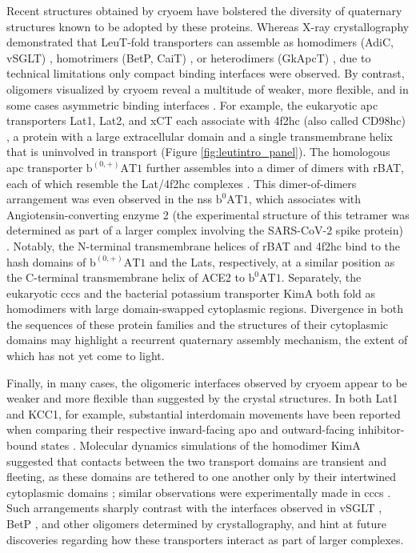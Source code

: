 Recent structures obtained by \gls{cryoem} have bolstered the diversity of quaternary structures known to be adopted by these proteins. Whereas X-ray crystallography demonstrated that LeuT-fold transporters can assemble as homodimers (AdiC, vSGLT) \citep*{Faham2008, Gao2009}, homotrimers (BetP, CaiT) \citep*{Ressl2009, Schulze2010}, or heterodimers (GkApcT) \citep*{Jungnickel2018}, due to technical limitations only compact binding interfaces were observed. By contrast, oligomers visualized by \gls{cryoem} reveal a multitude of weaker, more flexible, and in some cases asymmetric binding interfaces \citep*{Chew2019, Lee2019, Oda2020, Tascon2020, Yan2020a, Yan2020b, Yan2019, Yan2020}. For example, the eukaryotic \gls{apc} transporters Lat1, Lat2, and xCT each associate with 4f2hc (also called CD98hc) \citep*{Jeckelmann2020, Oda2020, Yan2019, Yan2020}, a protein with a large extracellular domain and a single transmembrane helix that is uninvolved in transport (Figure \ref{fig:leutintro_panel}). The homologous \gls{apc} transporter $\mathrm{b^{(0,+)}AT1}$ further assembles into a dimer of dimers with rBAT, each of which resemble the Lat/4f2hc complexes \citep*{Wu2020, Yan2020a}. This dimer-of-dimers arrangement was even observed in the \gls{nss} $\mathrm{b^{0}AT1}$, which associates with Angiotensin-converting enzyme 2 (the experimental structure of this tetramer was determined as part of a larger complex involving the SARS-CoV-2 spike protein) \citep*{Yan2020b}. Notably, the N-terminal transmembrane helices of rBAT and 4f2hc bind to the hash domains of $\mathrm{b^{(0,+)}AT1}$ and the Lats, respectively, at a similar position as the C-terminal transmembrane helix of ACE2 to $\mathrm{b^{0}AT1}$. Separately, the eukaryotic \gls{ccc}s \citep*{ Chew2019, Chi2020, Liu2019, Reid2020, Yang2020} and the bacterial potassium transporter KimA \citep*{Tascon2020} both fold as homodimers with large domain-swapped cytoplasmic regions. Divergence in both the sequences of these protein families and the structures of their cytoplasmic domains may highlight a recurrent quaternary assembly mechanism, the extent of which has not yet come to light.

Finally, in many cases, the oligomeric interfaces observed by \gls{cryoem} appear to be weaker and more flexible than suggested by the crystal structures. In both Lat1 and KCC1, for example, substantial interdomain movements have been reported when comparing their respective inward-facing apo and outward-facing inhibitor-bound states \citep*{Liu2019, Yan2021, Yan2019, Yan2020, Zhao2020}. Molecular dynamics simulations of the homodimer KimA suggested that contacts between the two transport domains are transient and fleeting, as these domains are tethered to one another only by their intertwined cytoplasmic domains \citep*{Tascon2020}; similar observations were experimentally made in \gls{ccc}s \citep*{Chi2021}. Such arrangements sharply contrast with the interfaces observed in vSGLT \citep*{Faham2008, Watanabe2010}, BetP \citep*{Ressl2009}, and other oligomers determined by crystallography, and hint at future discoveries regarding how these transporters interact as part of larger complexes.

